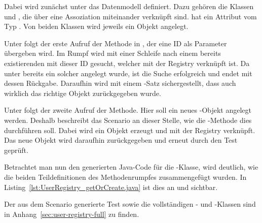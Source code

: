 
Dabei wird zunächst unter  das Datenmodell definiert.
Dazu gehören die Klassen  und , die über eine Assoziation miteinander verknüpft sind.
 hat ein Attribut  vom Typ .
Von beiden Klassen wird jeweils ein Objekt angelegt.

Unter  folgt der erste Aufruf der Methode  in , der eine ID als Parameter übergeben wird.
Im Rumpf wird mit einer Schleife nach einem bereits existierenden  mit dieser ID gesucht, welcher mit der Registry verknüpft ist.
Da unter  bereits ein solcher angelegt wurde, ist die Suche erfolgreich und endet mit dessen Rückgabe.
Daraufhin wird mit einem -Satz sichergestellt, dass auch wirklich das richtige Objekt zurückgegeben wurde.

Unter  folgt der zweite Aufruf der Methode.
Hier soll ein neues -Objekt angelegt werden.
Deshalb beschreibt das Scenario an dieser Stelle, wie die -Methode dies durchführen soll.
Dabei wird ein Objekt erzeugt und mit der Registry verknüpft.
Das neue Objekt wird daraufhin zurückgegeben und erneut durch den Test geprüft.

Betrachtet man nun den generierten Java-Code für die -Klasse, wird deutlich, wie die beiden Teildefinitionen des Methodenrumpfes zusammengefügt wurden.
In Listing~\ref{lst:UserRegistry_getOrCreate.java} ist dies an  und  sichtbar.


Der aus dem Scenario generierte Test sowie die vollständigen - und -Klassen sind in Anhang~\ref{sec:user-registry-full} zu finden.
